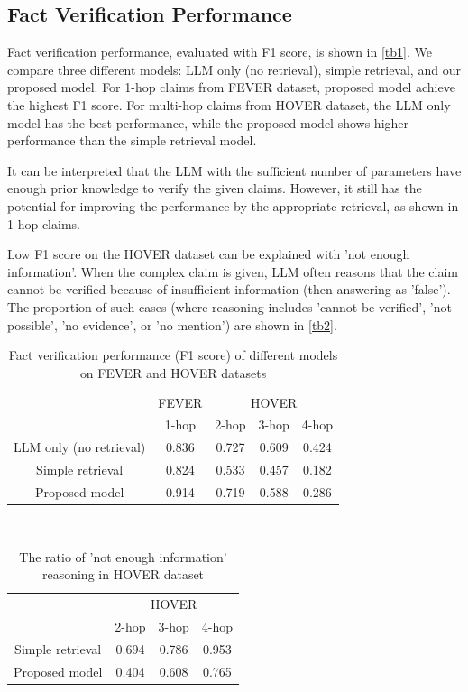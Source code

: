 \documentclass{article}
\begin{document}
\subsection{Fact Verification Performance}
Fact verification performance, evaluated with F1 score, is shown in \autoref{tb1}. We compare three different models: LLM only (no retrieval), simple retrieval, and our proposed model. For 1-hop claims from FEVER dataset, proposed model achieve the highest F1 score. For multi-hop claims from HOVER dataset, the LLM only model has the best performance, while the proposed model shows higher performance than the simple retrieval model. \par
It can be interpreted that the LLM with the sufficient number of parameters have enough prior knowledge to verify the given claims. However, it still has the potential for improving the performance by the appropriate retrieval, as shown in 1-hop claims. \par
Low F1 score on the HOVER dataset can be explained with 'not enough information'. When the complex claim is given, LLM often reasons that the claim cannot be verified because of insufficient information (then answering as 'false'). The proportion of such cases (where reasoning includes 'cannot be verified', 'not possible', 'no evidence', or 'no mention') are shown in \autoref{tb2}. 

\begin{table}[h]
  \centering
  \begin{tabular}{c|c|ccc}
  \toprule
           & FEVER & \multicolumn{3}{c}{HOVER} \\ 
           & 1-hop & 2-hop   & 3-hop  & 4-hop  \\ \midrule
  LLM only (no retrieval) & 0.836  & 0.727  & 0.609   & 0.424   \\[0.5mm]
  Simple retrieval & 0.824  & 0.533 & 0.457  & 0.182   \\[0.5mm]
  Proposed model & 0.914  & 0.719    & 0.588   & 0.286   \\ \bottomrule
  
  \end{tabular}\\[5pt]
  \caption{\label{tb1}Fact verification performance (F1 score) of different models on FEVER and HOVER datasets}
\end{table}

\begin{table}[h]
  \centering
  \begin{tabular}{c|ccc}
  \toprule
           & \multicolumn{3}{c}{HOVER} \\ 
           & 2-hop   & 3-hop  & 4-hop  \\ \midrule
  Simple retrieval  & 0.694 & 0.786  & 0.953   \\[0.5mm]
  Proposed model  & 0.404   & 0.608   & 0.765   \\ \bottomrule
  
  \end{tabular}\\[5pt]
  \caption{\label{tb2}The ratio of 'not enough information' reasoning in HOVER dataset}
\end{table}
\end{document}
